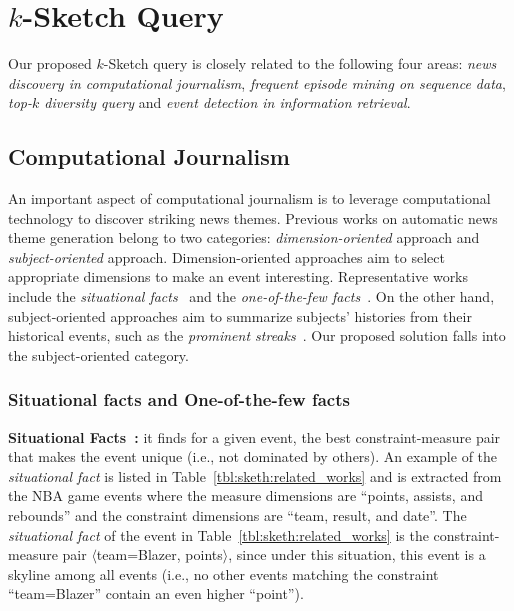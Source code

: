 \section{$k$-Sketch Query}\label{sec:related_work:sketch}
Our proposed $k$-Sketch query is closely related
to the following four areas: 
\emph{news discovery in computational journalism}, 
\emph{frequent episode mining on sequence data}, 
\emph{top-$k$ diversity query} and \emph{event detection in information retrieval}.

\subsection{Computational Journalism}
An important aspect of computational journalism
is to leverage computational technology to discover
striking news themes. 
Previous works on automatic news theme generation belong to two categories: \emph{dimension-oriented} approach and \emph{subject-oriented} approach. Dimension-oriented approaches aim to select appropriate dimensions to make an event interesting. 
Representative works include the \emph{situational facts}~\cite{sultana2014incremental} and the \emph{one-of-the-few facts}~\cite{wu2012one}. On the other hand, subject-oriented approaches aim to
summarize subjects' histories from their historical events, such as the \emph{prominent streaks}~\cite{zhang2014discovering}. Our proposed solution falls into the subject-oriented category. 


\subsubsection{Situational facts and One-of-the-few facts}
\textbf{Situational Facts~\cite{sultana2014incremental}:} it finds for a given event, the best constraint-measure pair that makes the event unique (i.e., not dominated by others). 
An example of the \emph{situational fact} is listed in Table~\ref{tbl:sketh:related_works} and is extracted from the NBA game events where the measure dimensions are ``points, assists, and rebounds'' and the constraint dimensions are ``team, result, and date''. The \emph{situational fact} of the event in Table~\ref{tbl:sketh:related_works} is the constraint-measure pair $\langle$team=Blazer, points$\rangle$, since under
this situation, this event is a skyline among all events (i.e., no other events matching the constraint ``team=Blazer'' contain an even higher ``point'').


